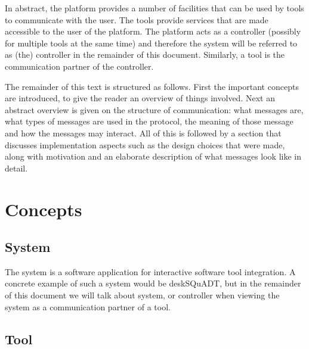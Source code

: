 \documentclass{article}
\begin{document}
  In abstract, the platform provides a number of facilities that can be used by
  tools to communicate with the user. The tools provide services that are made
  accessible to the user of the platform. The platform acts as a controller
  (possibly for multiple tools at the same time) and therefore the system will
  be referred to as (the) controller in the remainder of this document.
  Similarly, a tool is the communication partner of the controller.

  The remainder of this text is structured as follows. First the important
  concepts are introduced, to give the reader an overview of things involved.
  Next an abstract overview is given on the structure of communication: what
  messages are, what types of messages are used in the protocol, the meaning of
  those message and how the messages may interact. All of this is followed by a
  section that discusses implementation aspects such as the design choices that
  were made, along with motivation and an elaborate description of what
  messages look like in detail.

 \pagebreak

 \section{Concepts}

  \subsection{System}

   The system is a software application for interactive software tool
   integration. A concrete example of such a system would be deskSQuADT, but in
   the remainder of this document we will talk about system, or controller when
   viewing the system as a communication partner of a tool.

   
   
  \subsection{Tool}
\end{document}
